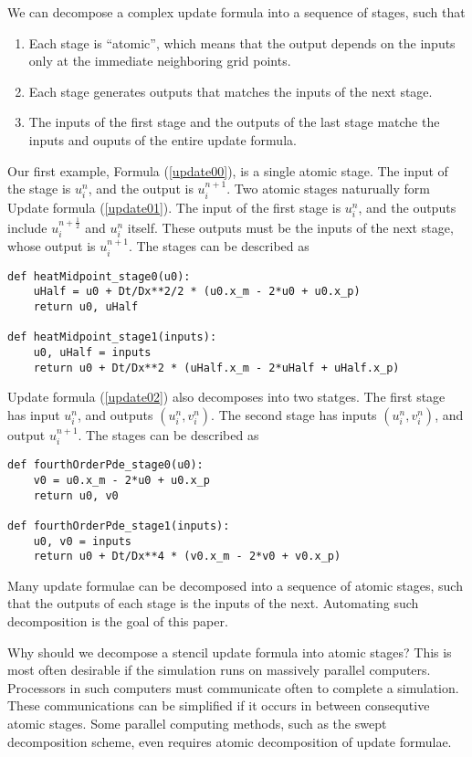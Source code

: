 \documentclass[12pt]{article}
\begin{document}
We can decompose a complex update formula into a sequence of stages, such that
\begin{enumerate}
\item Each stage is ``atomic'', which means that the output depends on the inputs only at the immediate neighboring grid points.
\item Each stage generates outputs that matches the inputs of the next stage.
\item The inputs of the first stage and the outputs of the last stage matche the inputs and ouputs of the entire update formula.
\end{enumerate}
Our first example, Formula (\ref{update00}), is a single atomic stage.  The input of the stage is $u_i^n$, and the output is $u_i^{n+1}$.  Two atomic stages naturually form Update formula (\ref{update01}).  The input of the first stage is $u_i^n$, and the outputs include $u_i^{n+\frac12}$ and $u_i^{n}$
itself.  These outputs must be the inputs of the next stage, whose output is $u_i^{n+1}$.  The stages can be described as
\begin{lstlisting}
def heatMidpoint_stage0(u0):
    uHalf = u0 + Dt/Dx**2/2 * (u0.x_m - 2*u0 + u0.x_p)
    return u0, uHalf

def heatMidpoint_stage1(inputs):
    u0, uHalf = inputs
    return u0 + Dt/Dx**2 * (uHalf.x_m - 2*uHalf + uHalf.x_p)
\end{lstlisting}

Update formula (\ref{update02}) also decomposes into two statges.  The first stage has input $u_i^n$, and outputs $(u_i^n, v_i^n)$.  The second stage has inputs $(u_i^n, v_i^n)$, and output $u_i^{n+1}$.  The stages can be described as
\begin{lstlisting}
def fourthOrderPde_stage0(u0):
    v0 = u0.x_m - 2*u0 + u0.x_p
    return u0, v0

def fourthOrderPde_stage1(inputs):
    u0, v0 = inputs
    return u0 + Dt/Dx**4 * (v0.x_m - 2*v0 + v0.x_p)
\end{lstlisting}
Many update formulae can be decomposed into a sequence of atomic stages, such that the outputs of each stage is the inputs of the next.  Automating such decomposition is the goal of this paper.

Why should we decompose a stencil update formula into atomic stages?  This is most often desirable if the simulation runs on massively parallel computers.  Processors in such computers must communicate often to complete a simulation.  These communications can be simplified if it occurs in between consequtive atomic stages.  Some parallel computing methods, such as the swept decomposition scheme, even requires atomic decomposition of update formulae.
\end{document}
